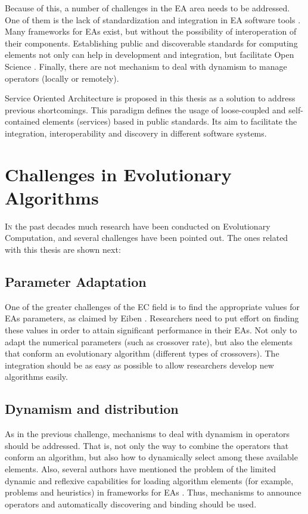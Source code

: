 Because of this, a number of challenges in the EA area needs to be addressed.  One of them is the lack of standardization and integration in EA software tools \cite{SURVEYMOFS}. Many frameworks for EAs exist, but without the possibility of interoperation of their components. Establishing public and discoverable standards for computing elements not only can help in development and integration, but facilitate Open Science \cite{Foster2005Science}. Finally, there are not mechanism to deal with dynamism to manage operators (locally or remotely).

Service Oriented Architecture \cite{Papazoglou2007SOA} is proposed in this thesis as a solution to address previous shortcomings. This paradigm defines the usage of loose-coupled and self-contained elements (services) based in public standards. Its aim to facilitate the integration, interoperability and discovery in different software systems.


\section{Challenges in Evolutionary Algorithms}
\label{sec:intro:challenges}

\lettrine{I}{n} the past decades much research have been conducted on Evolutionary Computation, and several challenges have been pointed out. The ones related with this thesis are shown next:

\subsection{Parameter Adaptation}

One of the greater challenges of the EC field is to find the appropriate values for EAs parameters, as claimed by {\person Eiben \etal} 
\cite{Eiben12Parameters}. Researchers need to put effort on finding these values in order to
attain significant performance in their EAs. Not only to adapt the numerical parameters (such as crossover rate), but also the elements that conform an evolutionary algorithm (different types of crossovers). The integration should be as easy as possible to allow researchers develop new algorithms easily. 

\subsection{Dynamism and distribution}
As in the previous challenge, mechanisms to deal with dynamism in operators should be addressed. That is, not only the way to combine the operators that conform an algorithm, but also how to dynamically select among these available elements. Also, several authors have mentioned the problem of the limited dynamic and reflexive capabilities for loading algorithm elements (for example, problems and heuristics) in frameworks for EAs \cite{SURVEYMOFS}. Thus, mechanisms to announce operators and automatically discovering and binding should be used.

